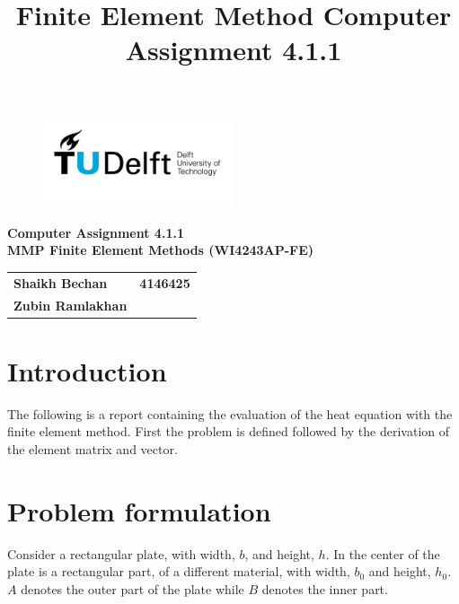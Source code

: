\documentclass[10pt,a4paper]{article}
\title{Finite Element Method Computer Assignment 4.1.1}
\begin{document}
\begin{figure}[t]
	\centering
	\includegraphics[width=0.5\textwidth]{TU_d_line_P1_color_1.jpg}
\end{figure}

\begin{center}
	\textbf{Computer Assignment 4.1.1}\\
	\textbf{MMP Finite Element Methods (WI4243AP-FE)}
	\begin{tabular}{lr}
		\textbf{Shaikh Bechan} & \textbf{4146425}\\
		\textbf{Zubin Ramlakhan} & \\
	\end{tabular}
\end{center}

\section{Introduction}
The following is a report containing the evaluation of the heat equation with the finite element method.
First the problem is defined followed by the derivation of the element matrix and vector.

\section{Problem formulation}
Consider a rectangular plate, with width, $b$, and height, $h$. In the center of the plate is a rectangular part, of a different material, with width, $b_0$ and height, $h_0$. $A$ denotes the outer part of the plate while $B$ denotes the inner part.
\end{document}
